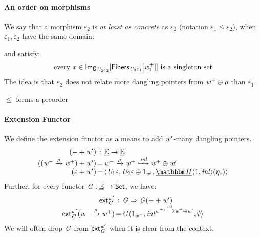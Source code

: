 \paragraph{An order on morphisms}

We say that a morphism $\varepsilon_2$ is \emph{at least as concrete} as $\varepsilon_2$ (notation $\varepsilon_1 \leq \varepsilon_2$), 
when $\varepsilon_1, \varepsilon_2$ have the same domain: 
\begin{center}
\end{center}
and satisfy:
\[ \text{ every } \mathit{x} \in \mathsf{Img}_{\mathit{U}_2\varepsilon_2}[\mathsf{Fibers}_{\mathit{U}_2\varepsilon_1}[\mathit{w}_1^+]] \text{ is a singleton set } \]
The idea is that $\varepsilon_2$ does not relate more dangling pointers from $\mathit{w}^+ \ominus \rho$ than $\varepsilon_1$.

\begin{example}
\end{example}

\begin{lemma}$\leq$ forms a preorder\end{lemma}

\paragraph{Extension Functor}
We define the extension functor as a means to add $\mathit{w}'$-many dangling pointers.
\[\begin{array}{r@{\,}c@{\,}l}
    \extF\dash{\vw'} & : & \dinitC \to \dinitC \\
    \extF{(\vw^- \xto\rho \vw^+)}{\vw'} & = & \vw^- \xto\rho \vw^+ \xinclto{\inl} \vw^+ \oplus \vw' \\
    \extF\varepsilon{\vw'} & = & \triple{\vU_1\varepsilon}{\vU_2\varepsilon \oplus 1_{\vw'}}{\dheapF\tup1\inl(\eta_\varepsilon)}
\end{array}\]
Further, for every functor $\mathit{G} : \underline{\mathbb{E}} \to \mathsf{Set}$, we have:
\[\begin{array}{r@{\,}c@{\,}l}
    \extNat\vG{\vw'} & : & \vG \To \vG\extF\dash{\vw'} \\
    \extNat\vG{\vw'}{(\vw^- \xto\rho \vw^+)} & = & \vG{\triple{1_{\vw^-}}{\inl^{\vw^+ \xinclto\inl \vw^+ \oplus \vw'}}\emptyset}
\end{array}\]
We will often drop $\mathit{G}$ from ${\mathsf{ext}^{\mathit{w}'}_{\mathit{G}}}$ when it is clear from the context.

